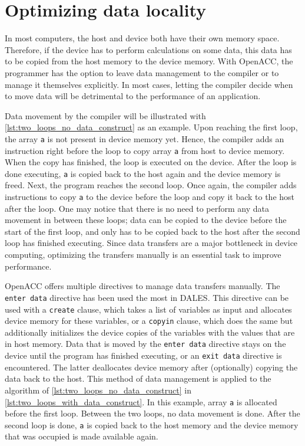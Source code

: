 \section{Optimizing data locality}
In most computers, the host and device both have their own memory space. Therefore, if the device has to perform calculations on some data, this data has to be copied from the host memory to the device memory. With OpenACC, the programmer has the option to leave data management to the compiler or to manage it themselves explicitly. In most cases, letting the compiler decide when to move data will be detrimental to the performance of an application.

Data movement by the compiler will be illustrated with \autoref{lst:two_loops_no_data_construct} as an example. Upon reaching the first loop, the array \texttt{a} is not present in device memory yet. Hence, the compiler adds an instruction right before the loop to copy array \texttt{a} from host to device memory. When the copy has finished, the loop is executed on the device. After the loop is done executing, \texttt{a} is copied back to the host again and the device memory is freed. Next, the program reaches the second loop. Once again, the compiler adds instructions to copy \texttt{a} to the device before the loop and copy it back to the host after the loop. One may notice that there is no need to perform any data movement in between these loops; data can be copied to the device before the start of the first loop, and only has to be copied back to the host after the second loop has finished executing. Since data transfers are a major bottleneck in device computing, optimizing the transfers manually is an essential task to improve performance. 

OpenACC offers multiple directives to manage data transfers manually. The \texttt{enter data} directive has been used the most in DALES. This directive can be used with a \texttt{create} clause, which takes a list of variables as input and allocates device memory for these variables, or a \texttt{copyin} clause, which does the same but additionally initializes the device copies of the variables with the values that are in host memory. Data that is moved by the \texttt{enter data} directive stays on the device until the program has finished executing, or an \texttt{exit data} directive is encountered. The latter deallocates device memory after (optionally) copying the data back to the host. This method of data management is applied to the algorithm of \autoref{lst:two_loops_no_data_construct} in \autoref{lst:two_loops_with_data_construct}. In this example, array \texttt{a} is allocated before the first loop. Between the two loops, no data movement is done. After the second loop is done, \texttt{a} is copied back to the host memory and the device memory that was occupied is made available again.

